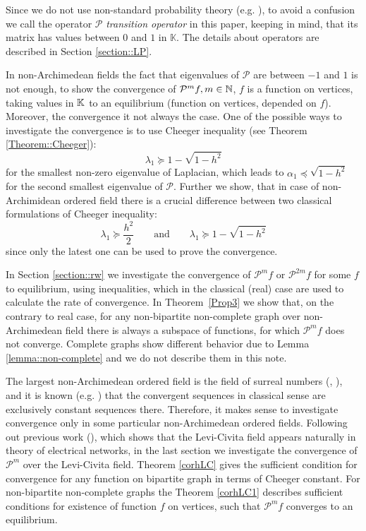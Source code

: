 \documentclass[a4paper,12pt]{amsart}
\theoremstyle{definition}
\renewcommand{\P}{\mathcal{P}}
\newcommand{\K}{\mathbb{K}}
\begin{document}
Since we do not use non-standard probability theory (e.g. \cite{Nelson}), to avoid a confusion we call the operator $\P$  \emph{transition operator} in this paper, keeping in mind, that its matrix has values between $0$ and $1$ in $\K$. The details about operators are described in Section \ref{section::LP}.

In non-Archimedean fields the fact that eigenvalues of $\P$ are between $-1$ and $1$ is not enough, to show the convergence of $\P^m f, m\in \Bbb N$, $f$ is a function on vertices, taking values in $\Bbb K$ to an equilibrium (function on vertices, depended on $f$). Moreover, the convergence it not always the case. One of the possible ways to investigate the convergence is to use Cheeger inequality (see Theorem \ref{Theorem::Cheeger}):
$$
\lambda_1\succeq 1-\sqrt{1-h^2}
$$
for the smallest non-zero eigenvalue of Laplacian, which leads to $\alpha_1\preceq \sqrt{1-h^2}$ for the second smallest eigenvalue of $\P$. Further we show, that in case of non-Archimidean ordered field there is a crucial difference between two classical formulations of Cheeger inequality: 
$$\lambda_1\succeq {\frac{h^2}{2}}
\;\;\;\;\;\;\mbox{ and }\;\;\;\;\;\;
\lambda_1\succeq 1-\sqrt{1-h^2}
$$
since only the latest one can be used to prove the convergence. 

In Section \ref{section::rw} we investigate the convergence of $\P^m f$ or $\P^{2m} f$ for some $f$ to equilibrium, using inequalities, which in the classical (real) case are used to calculate the rate of convergence. In Theorem~\ref{Prop3} we show that, on the contrary to real case, for any non-bipartite non-complete graph over non-Archimedean field there is always a subspace of functions, for which  $\P^m f$ does not converge. Complete graphs show different behavior due to Lemma \ref{lemma::non-complete} and we do not describe them in this note.

The largest non-Archimedean ordered field is the field of surreal numbers (\cite{Conway}, \cite[Theorem 24.29]{BB}), and it is known (e.g. \cite{RSS}) that the convergent sequences in classical sense are  exclusively constant sequences there. Therefore, it makes sense to investigate convergence only in some particular non-Archimedean ordered fields. Following out previous work (\cite{Muranova2}), which shows that the Levi-Civita field appears naturally in theory of electrical networks, in the last section we investigate the convergence of $\P^m$ over the Levi-Civita field. Theorem \ref{corhLC} gives the sufficient condition for convergence for any function on bipartite graph in terms of Cheeger constant. For non-bipartite non-complete graphs the Theorem \ref{corhLC1} describes sufficient conditions for existence of function $f$ on vertices, such that $\P^m f$ converges to an equilibrium.
\end{document}
